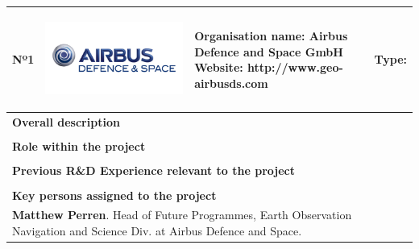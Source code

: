 \begin{longtable}[H]{|p{0.7cm}|p{4cm}|p{7cm}|p{1.3cm}|}
	\hline
	\begin{center} Nº1 \end{center} & \begin{center} \includegraphics[scale=0.09]{./logos/Airbus-defence-and-space-logo} \end{center} & \begin{center} \textbf{Organisation name:} Airbus Defence and Space GmbH \newline \textbf{Website:} http://www.geo-airbusds.com \end{center} & \begin{center} Type: \end{center} \\ \hline
	
	\multicolumn{4}{|p{13cm}|}{\textbf{Overall description}}  \\ \hline
	
	\multicolumn{4}{|p{13cm}|}{}  \\ \hline
	
	\multicolumn{4}{|p{13cm}|}{\textbf{Role within the project}}   \\ \hline
	
	\multicolumn{4}{|p{13cm}|}{}  \\ \hline
	
	\multicolumn{4}{|p{13cm}|}{\textbf{Previous R\&D Experience relevant to the project}}  \\ \hline
	
	\multicolumn{4}{|p{13cm}|}{}  \\ \hline
	
	\multicolumn{4}{|p{13cm}|}{\textbf{Key persons assigned to the project}}   \\ \hline
	
	
	\multicolumn{4}{|p{13cm}|}{\textbf{Matthew Perren}. Head of Future Programmes, Earth Observation Navigation and Science Div. at Airbus Defence and Space.}  \\ \hline
	

\end{longtable}

